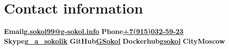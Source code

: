 \documentclass[9pt, a4paper, english]{extarticle}
\begin{document}
\section* {Contact information}
\textbf{Email}\textbf{\href{mailto:g.sokol99@g-sokol.info}{g.sokol99@g-sokol.info}}\newline
\textbf{Phone}\textbf{\href{tel:+7(915)032-59-23}{+7(915)032-59-23}}\newline
\textbf{Skype}\textbf{\href{skype:g\_a\_sokolik?call}{g\_a\_sokolik}}\newline
\textbf{GitHub}\textbf{\href{https://github.com/GSokol}{GSokol}}\newline
\textbf{Dockerhub}\textbf{\href{https://hub.docker.com/u/gsokol/}{gsokol}}\newline
\textbf{City}\textbf{Moscow}
\end{document}
